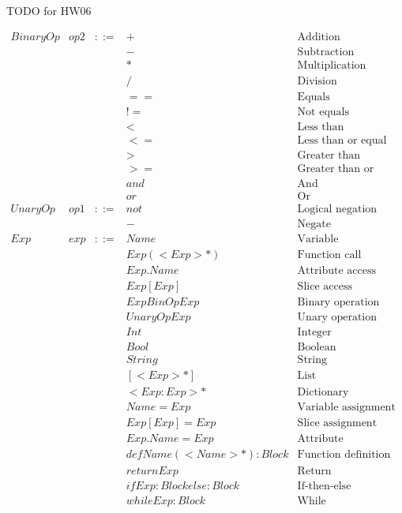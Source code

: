 \documentclass[acmsmall,review,authorversion]{acmart}
\begin{document}
TODO for HW06

\[\begin{array}{lrcll}
BinaryOp & op2 & ::= & + & \text{Addition}
\\
&&& - & \text{Subtraction}
\\
&&& * & \text{Multiplication}
\\
&&& / & \text{Division}
\\
&&& == & \text{Equals}
\\
&&& != & \text{Not equals}
\\
&&& < & \text{Less than}
\\
&&& <= & \text{Less than or equal to}
\\
&&& > & \text{Greater than}
\\
&&& >= & \text{Greater than or equal to}
\\
&&& and & \text{And}
\\
&&& or & \text{Or}
\\
UnaryOp & op1 & ::= & not & \text{Logical negation}
\\ 
&&& - & \text{Negate}
\\
Exp & exp & ::= & Name & \text{Variable}
\\
&&& Exp(<Exp>*) & \text{Function call}
\\
&&& Exp.Name & \text{Attribute access}
\\
&&& Exp[Exp] & \text{Slice access}
\\
&&& Exp BinOp Exp & \text{Binary operation}
\\
&&& UnaryOp Exp & \text{Unary operation}
\\
&&& Int & \text{Integer}
\\
&&& Bool & \text{Boolean}
\\
&&& String & \text{String}
\\
&&& [<Exp>*] & \text{List}
\\
&&& {<Exp:Exp>*} & \text{Dictionary}
\\
&&& Name = Exp & \text{Variable assignment}
\\
&&& Exp[Exp] = Exp & \text{Slice assignment}
\\
&&& Exp.Name = Exp & \text{Attribute assignment}
\\
&&& def Name(<Name>*) : Block & \text{Function definition}
\\
&&& return Exp & \text{Return}
\\
&&& if Exp: Block else: Block & \text{If-then-else}
\\
&&& while Exp: Block & \text{While}
\\
\end{array}\]
\end{document}
